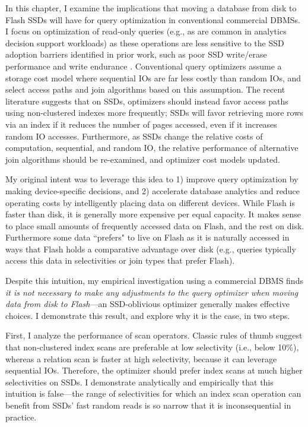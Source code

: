 In this chapter, I examine the implications that moving a database from disk to Flash SSDs will have for query optimization in conventional commercial DBMSs.
I focus on optimization of read-only queries (e.g., as are common in analytics decision support workloads) as these operations are less sensitive to the SSD adoption barriers identified in prior work, such as poor SSD write/erase performance \cite{Chen2009} and write endurance \cite{Roberts2009}.
Conventional query optimizers assume a storage cost model where sequential IOs are far less costly than random IOs, and select access paths and join algorithms based on this assumption.
The recent literature \cite{Baumann2010} suggests that on SSDs, optimizers should instead favor access paths using non-clustered indexes more frequently; SSDs will favor retrieving more rows via an index if it reduces the number of pages accessed, even if it increases random IO accesses.
Furthermore, as SSDs change the relative costs of computation, sequential, and random IO, the relative performance of alternative join algorithms should be re-examined, and optimizer cost models updated.

My original intent was to leverage this idea to 1) improve query optimization by making device-specific decisions, and 2) accelerate database analytics and reduce operating costs by intelligently placing data on different devices.
While Flash is faster than disk, it is generally more expensive per equal capacity.
It makes sense to place small amounts of frequently accessed data on Flash, and the rest on disk.
Furthermore some data ``prefers" to live on Flash as it is naturally accessed in ways that Flash holds a comparative advantage over disk (e.g., queries typically access this data in selectivities or join types that prefer Flash).

Despite this intuition, my empirical investigation using a commercial DBMS finds \emph{it is not necessary to make any adjustments to the query optimizer when moving data from disk to Flash}---an SSD-oblivious optimizer generally makes effective choices.
I demonstrate this result, and explore why it is the case, in two steps.

First, I analyze the performance of scan operators.  
Classic rules of thumb suggest that non-clustered index scans are preferable at low selectivity (i.e., below 10\%), whereas a relation scan is faster at high selectivity, because it can leverage sequential IOs.
Therefore, the optimizer should prefer index scans at much higher selectivities on SSDs.  
I demonstrate analytically and empirically that this intuition is false---the range of selectivities for which an index scan operation can benefit from SSDs' fast random reads is so narrow that it is inconsequential in practice.

